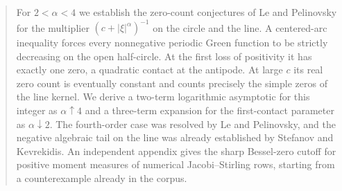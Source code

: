 \documentclass[11pt]{article}
\theoremstyle{plain}\newtheorem{theorem}{Theorem}[section]\newtheorem{lemma}[theorem]{Lemma}\newtheorem{corollary}[theorem]{Corollary}\newtheorem{proposition}[theorem]{Proposition}
\numberwithin{equation}{section}
\begin{document}
\thispagestyle{plain}
\par\vspace{9pt}
\par\vspace{7pt}
\par\vspace{10pt}
\par
\begin{abstract}
For $2<\alpha<4$ we establish the zero-count conjectures of Le and Pelinovsky for the multiplier $(c+|\xi|^\alpha)^{-1}$ on the circle and the line. A centered-arc inequality forces every nonnegative periodic Green function to be strictly decreasing on the open half-circle. At the first loss of positivity it has exactly one zero, a quadratic contact at the antipode. At large $c$ its real zero count is eventually constant and counts precisely the simple zeros of the line kernel. We derive a two-term logarithmic asymptotic for this integer as $\alpha\uparrow4$ and a three-term expansion for the first-contact parameter as $\alpha\downarrow2$. The fourth-order case was resolved by Le and Pelinovsky, and the negative algebraic tail on the line was already established by Stefanov and Kevrekidis. An independent appendix gives the sharp Bessel-zero cutoff for positive moment measures of numerical Jacobi--Stirling rows, starting from a counterexample already in the corpus.
\end{abstract}
\end{document}
